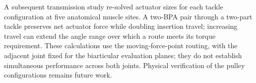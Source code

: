A subsequent transmission study re-solved actuator sizes for each tackle configuration at five anatomical muscle sites. A two-BPA pair through a two-part tackle preserves net actuator force while doubling insertion travel; increasing travel can extend the angle range over which a route meets its torque requirement. These calculations use the moving-force-point routing, with the adjacent joint fixed for the biarticular evaluation planes; they do not establish simultaneous performance across both joints. Physical verification of the pulley configurations remains future work.
